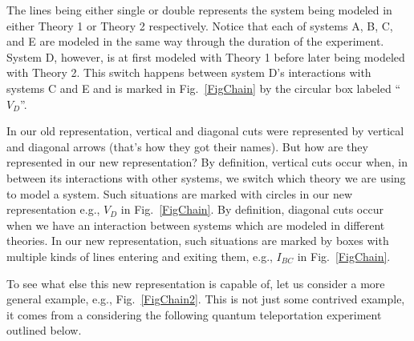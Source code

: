 \documentclass[prd,twocolumn,superscriptaddress,floatfix,amsmath,amssymb,amsfonts,nofootinbib]{revtex4-2}
\begin{document}
The lines being either single or double represents the system being modeled in either Theory 1 or Theory 2 respectively. Notice that each of systems A, B, C, and E are modeled in the same way through the duration of the experiment. System D, however, is at first modeled with Theory 1 before later being modeled with Theory 2. This switch happens between system D's interactions with systems C and E and is marked in Fig.~\ref{FigChain} by the circular box labeled ``$V_D$''.

In our old representation, vertical and diagonal cuts were represented by vertical and diagonal arrows (that's how they got their names). But how are they represented in our new representation? By definition, vertical cuts occur when, in between its interactions with other systems, we switch which theory we are using to model a system. Such situations are  marked with circles in our new representation e.g., $V_{D}$ in Fig.~\ref{FigChain}. By definition, diagonal cuts occur when we have an interaction between systems which are modeled in different theories. In our new representation, such situations are marked by boxes with multiple kinds of lines entering and exiting them, e.g., $I_{BC}$ in Fig.~\ref{FigChain}.

To see what else this new representation is capable of, let us consider a more general example, e.g., Fig.~\ref{FigChain2}. This is not just some contrived example, it comes from a considering the following quantum teleportation experiment~\cite{Nielsen2000} outlined below. 
\end{document}

